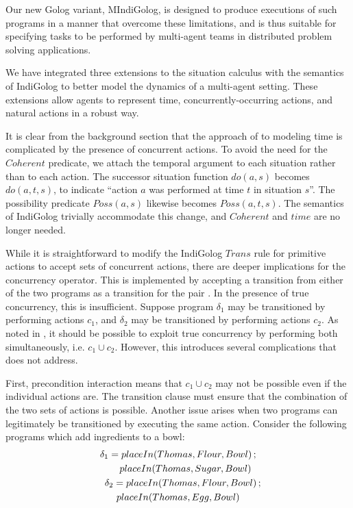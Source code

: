 \documentclass[times, 10pt, twocolumn]{article}
\begin{document}
Our new Golog variant, MIndiGolog, is designed to produce executions
of such programs in a manner that overcome these limitations, and
is thus suitable for specifying tasks to be performed by multi-agent
teams in distributed problem solving applications.


We have integrated three extensions to the situation calculus with
the semantics of IndiGolog to better model the dynamics of a multi-agent
setting. These extensions allow agents to represent time, concurrently-occurring
actions, and natural actions in a robust way.


It is clear from the background section that the approach of \cite{reiter96sc_nat_conc}
to modeling time is complicated by the presence of concurrent actions.
To avoid the need for the $Coherent$ predicate, we attach the temporal
argument to each situation rather than to each action. The successor
situation function $do(a,s)$ becomes $do(a,t,s)$, to indicate {}``action
$a$ was performed at time $t$ in situation $s$''. The possibility
predicate $Poss(a,s)$ likewise becomes $Poss(a,t,s)$. The semantics
of IndiGolog trivially accommodate this change, and
$Coherent$ and $time$ are no longer needed.


While it is straightforward to modify the IndiGolog $Trans$ rule
for primitive actions to accept sets of concurrent actions, there
are deeper implications for the concurrency operator. This is implemented
by accepting a transition from either of the two programs as a transition
for the pair \cite{giacomo00congolog}. In the presence of true concurrency,
this is insufficient. Suppose program $\delta_{1}$ may be transitioned
by performing actions $c_{1}$, and $\delta_{2}$ may be transitioned
by performing actions $c_{2}$. As noted in \cite{pinto99tcongolog},
it should be possible to exploit true concurrency by performing both
simultaneously, i.e. $c_{1}\cup c_{2}$. However, this introduces
several complications that \cite{pinto99tcongolog} does not address.

First, precondition interaction means that $c_{1}\cup c_{2}$ may
not be possible even if the individual actions are. The transition
clause must ensure that the combination of the two sets of actions
is possible. Another issue arises when two programs can legitimately
be transitioned by executing the same action. Consider the following
programs which add ingredients to a bowl:
\begin{multline*}
\delta_{1}=placeIn(Thomas,Flour,Bowl)\,;\\
\shoveright{placeIn(Thomas,Sugar,Bowl)}\\
\shoveleft{\delta_{2}=placeIn(Thomas,Flour,Bowl)\,;}\\
placeIn(Thomas,Egg,Bowl)
\end{multline*}
\end{document}
